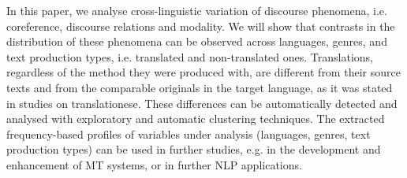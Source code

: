 In this paper, we analyse cross-linguistic variation of discourse phenomena, i.e. coreference, discourse relations and modality. We will show that contrasts in the distribution of these phenomena can be observed across languages, genres, and text production types, i.e. translated and non-translated ones. Translations, regardless of the method they were produced with, are different from their source texts and from the comparable originals in the target language, as it was stated in studies on translationese. These differences can be automatically detected and analysed with exploratory and automatic clustering techniques. The extracted frequency-based profiles of variables under analysis (languages, genres, text production types) can be used in further studies, e.g. in the development and enhancement of MT systems, or in further NLP applications.
